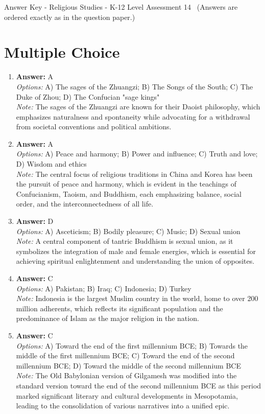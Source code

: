\documentclass[12pt]{article}
\begin{document}
\begin{center}
Answer Key - Religious Studies - K-12 Level Assessment 14 \
\small (Answers are ordered exactly as in the question paper.)
\end{center}

\section*{Multiple Choice}
\begin{enumerate}[label=\arabic*.]
\item \textbf{Answer:} A
\\ \textit{Options:} A) The sages of the Zhuangzi; B) The Songs of the South; C) The Duke of Zhou; D) The Confucian "sage kings"
\\ \textit{Note:} The sages of the Zhuangzi are known for their Daoist philosophy, which emphasizes naturalness and spontaneity while advocating for a withdrawal from societal conventions and political ambitions.
\item \textbf{Answer:} A
\\ \textit{Options:} A) Peace and harmony; B) Power and influence; C) Truth and love; D) Wisdom and ethics
\\ \textit{Note:} The central focus of religious traditions in China and Korea has been the pursuit of peace and harmony, which is evident in the teachings of Confucianism, Taoism, and Buddhism, each emphasizing balance, social order, and the interconnectedness of all life.
\item \textbf{Answer:} D
\\ \textit{Options:} A) Asceticism; B) Bodily pleasure; C) Music; D) Sexual union
\\ \textit{Note:} A central component of tantric Buddhism is sexual union, as it symbolizes the integration of male and female energies, which is essential for achieving spiritual enlightenment and understanding the union of opposites.
\item \textbf{Answer:} C
\\ \textit{Options:} A) Pakistan; B) Iraq; C) Indonesia; D) Turkey
\\ \textit{Note:} Indonesia is the largest Muslim country in the world, home to over 200 million adherents, which reflects its significant population and the predominance of Islam as the major religion in the nation.
\item \textbf{Answer:} C
\\ \textit{Options:} A) Toward the end of the first millennium BCE; B) Towards the middle of the first millennium BCE; C) Toward the end of the second millennium BCE; D) Toward the middle of the second millennium BCE
\\ \textit{Note:} The Old Babylonian version of Gilgamesh was modified into the standard version toward the end of the second millennium BCE as this period marked significant literary and cultural developments in Mesopotamia, leading to the consolidation of various narratives into a unified epic.
\end{enumerate}
\end{document}
